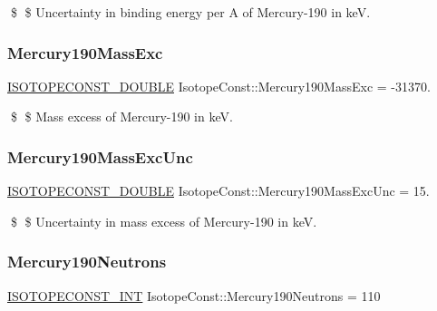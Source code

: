 \$ \$ Uncertainty in binding energy per A of Mercury-\/190 in keV. \mbox{\label{group___isotope_const-_mercury-_hg190_ga4f2d0b7bccb3d1d8333be5a876a43874}} 
\subsubsection{\texorpdfstring{Mercury190\+Mass\+Exc}{Mercury190MassExc}}
{\footnotesize\ttfamily \mbox{\hyperlink{group___isotope_const-_macros_ga8f45a7272ce02c0b4c65c44636ed719a}{I\+S\+O\+T\+O\+P\+E\+C\+O\+N\+S\+T\+\_\+\+D\+O\+U\+B\+LE}} Isotope\+Const\+::\+Mercury190\+Mass\+Exc = -\/31370.}

\$ \$ Mass excess of Mercury-\/190 in keV. \mbox{\label{group___isotope_const-_mercury-_hg190_gaf9a9a71b072df083e03979e98ab99eb6}} 
\subsubsection{\texorpdfstring{Mercury190\+Mass\+Exc\+Unc}{Mercury190MassExcUnc}}
{\footnotesize\ttfamily \mbox{\hyperlink{group___isotope_const-_macros_ga8f45a7272ce02c0b4c65c44636ed719a}{I\+S\+O\+T\+O\+P\+E\+C\+O\+N\+S\+T\+\_\+\+D\+O\+U\+B\+LE}} Isotope\+Const\+::\+Mercury190\+Mass\+Exc\+Unc = 15.}

\$ \$ Uncertainty in mass excess of Mercury-\/190 in keV. \mbox{\label{group___isotope_const-_mercury-_hg190_ga1fdea4906501a76fbcc6cc21fd0cf7a0}} 
\subsubsection{\texorpdfstring{Mercury190\+Neutrons}{Mercury190Neutrons}}
{\footnotesize\ttfamily \mbox{\hyperlink{group___isotope_const-_macros_ga5f18360b3e99483a35c32d789e62621c}{I\+S\+O\+T\+O\+P\+E\+C\+O\+N\+S\+T\+\_\+\+I\+NT}} Isotope\+Const\+::\+Mercury190\+Neutrons = 110}

